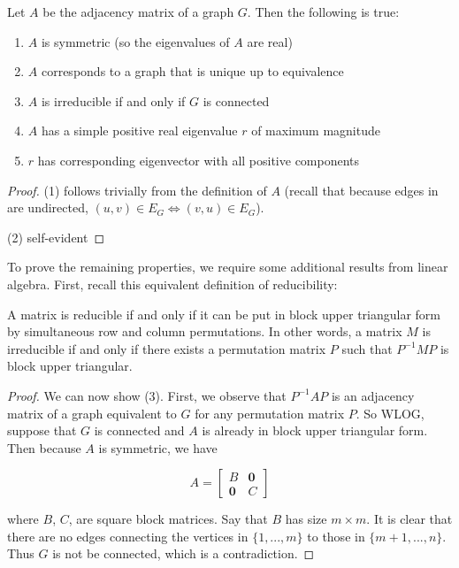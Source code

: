 \begin{remark}
  Let $A$ be the adjacency matrix of a graph $G$. Then the following is true:

  \begin{enumerate}
  \item $A$ is symmetric (so the eigenvalues of $A$ are real)
  \item $A$ corresponds to a graph that is unique up to equivalence
  \item $A$ is irreducible if and only if $G$ is connected
  \item $A$ has a simple positive real eigenvalue $r$ of maximum magnitude
  \item $r$ has corresponding eigenvector with all positive components
  \end{enumerate}
\end{remark}

\begin{proof}
  (1) follows trivially from the definition of $A$ (recall that because edges in
  are undirected, $(u,v) \in E_G \Leftrightarrow (v,u) \in E_G$).

  (2) self-evident
\end{proof}

To prove the remaining properties, we require some additional results from
linear algebra. First, recall this equivalent definition of reducibility:

\begin{definition}
  A matrix is reducible if and only if it can be put in block upper triangular
  form by simultaneous row and column permutations. In other words, a matrix $M$
  is irreducible if and only if there exists a permutation matrix $P$ such that
  $P^{-1}MP$ is block upper triangular.
\end{definition}

\begin{proof}
  We can now show (3). First, we observe that $P^{-1}AP$ is an adjacency matrix
  of a graph equivalent to $G$ for any permutation matrix $P$. So WLOG, suppose
  that $G$ is connected and $A$ is already in block upper triangular form. Then
  because $A$ is symmetric, we have

  \[
    A = \begin{bmatrix}
      B & \mathbf{0} \\
      \mathbf{0} & C
    \end{bmatrix}
  \]

  where $B$, $C$, are square block matrices. Say that $B$ has size $m \times m$.
  It is clear that there are no edges connecting the vertices in $\{1, ..., m\}$
  to those in $\{m+1, ..., n\}$. Thus $G$ is not be connected, which is a
  contradiction.
\end{proof}

